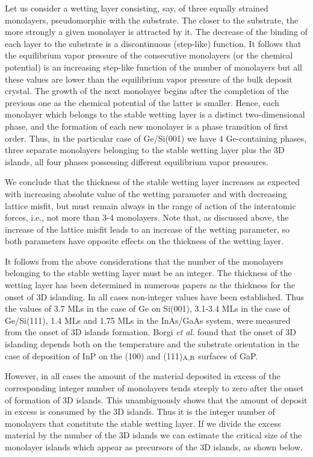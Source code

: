 \documentclass[aps,prl,showpacs,twocolumn,byrevtex,floatfix]{revtex4-1}
\begin{document}
Let us consider a wetting layer consisting, say, of three equally strained
monolayers, pseudomorphic with the substrate. The closer to the substrate, 
the more strongly a given monolayer is attracted by it. The
decrease of the binding of each layer to the substrate is a discontinuous
(step-like) function. It follows that the equilibrium vapor pressure of the
consecutive monolayers (or the chemical potential) is an increasing step-like
function of the number of monolayers but all these values are lower than the
equilibrium vapor pressure of the bulk deposit crystal.\cite{Grabow88} The
growth of the next monolayer begins after the completion of the previous one as
the chemical potential of the latter is smaller. Hence, each monolayer which
belongs to the stable wetting layer is a distinct two-dimensional phase, and the
formation of each new monolayer is a phase transition of first
order.\cite{Muller96} Thus, in the particular case of Ge/Si(001) we have 4
Ge-containing phases, three separate monolayers belonging to the stable wetting
layer plus the 3D islands, all four phases possessing different equilibrium 
vapor pressures.

We conclude that the thickness of the stable wetting layer increases as
expected with increasing absolute value of the wetting parameter and
with decreasing lattice misfit, but must remain always in the range
of action of the interatomic forces, i.e., not more than 3-4
monolayers. Note that, as discussed above, the increase of the lattice misfit
leads to an increase of the wetting parameter, so both parameters have
opposite effects on the thickness of the wetting layer.

It follows from the above considerations that the number of the monolayers 
belonging to the
stable wetting layer must be an integer. The thickness of the wetting layer
has been determined in numerous papers as the thickness for the onset of 3D
islanding. In all cases non-integer values have been established. Thus the
values of 3.7 MLs in the case of Ge on Si(001),\cite{Sunamura95} 3.1-3.4 MLs in
the case of Ge/Si(111),\cite{Grimm16} 1.4 MLs\cite{Saint-Girous02} and 1.75
MLs\cite{Moison94} in the InAs/GaAs system, were measured from the onset of
3D islands formation. Borgi {\em et al.} found that the onset of 3D
islanding depends both on the temperature and the substrate orientation
in the case of deposition of InP on the (100) and (111)$_{\rm A,B}$
surfaces of GaP.\cite{Borgi99}

However, in all cases the amount of the material deposited in excess of the
corresponding integer number of monolayers tends steeply to zero after 
the onset of formation of 3D islands.\cite{Sunamura95,Moison94} This 
unambiguously
shows that the amount of deposit in excess is consumed by the 3D islands.
Thus it is the integer number of monolayers that constitute the stable wetting
layer. If we divide the excess material by the number of the 3D islands we
can estimate the critical size of the monolayer islands which appear as
precursors of the 3D islands, as shown below.
\end{document}
